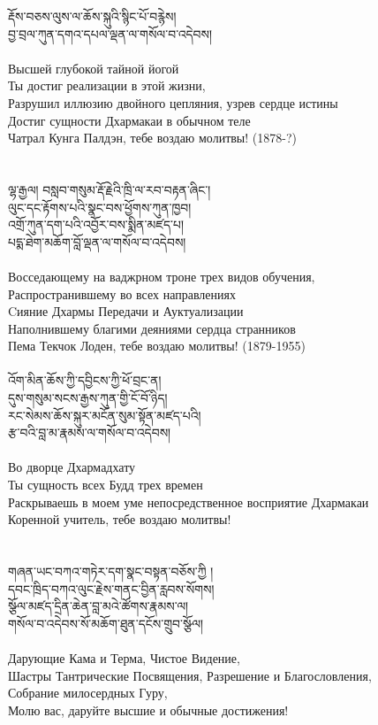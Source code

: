 རྡོས་བཅས་ལུས་ལ་ཆོས་སྐུའི་སྙིང་པོ་བརྙེས། \\
བྱ་བྲལ་ཀུན་དགའ་དཔལ་ལྡན་ལ་གསོལ་བ་འདེབས།\\
\\
\ru
Высшей глубокой тайной йогой \\ Ты достиг реализации в этой жизни,\\
Разрушил иллюзию двойного цепляния, узрев сердце истины \\
Достиг сущности Дхармакаи в обычном теле\\
Чатрал Кунга Палдэн, тебе воздаю молитвы! (1878-?)\\
\\
\\
\ti
ལྷ་རྒྱལ། བསླབ་གསུམ་རྡོ་རྗེའི་ཁྲི་ལ་རབ་བརྟན་ཞིང་། \\
ལུང་དང་རྟོགས་པའི་སྣང་བས་ཕྱོགས་ཀུན་ཁྱབ། \\
འགྲོ་ཀུན་དག་པའི་འབྱོར་བས་སྨིན་མཛད་པ། \\
པདྨ་ཐེག་མཆོག་བློ་ལྡན་ལ་གསོལ་བ་འདེབས།\\
\\
\ru
Восседающему на ваджрном троне трех видов обучения,\\
Распространившему во всех направлениях \\
Cияние Дхармы Передачи и Ауктуализации \\
Наполнившему благими деяниями сердца странников\\
Пема Текчок Лоден, тебе воздаю молитвы! (1879-1955)\\
\\
\newpage
\ti
འོག་མིན་ཆོས་ཀྱི་དབྱིངས་ཀྱི་ཕོ་བྲང་ན། \\
དུས་གསུམ་སངས་རྒྱས་ཀུན་གྱི་ངོ་བོ་ཉིད། \\
རང་སེམས་ཆོས་སྐུར་མངོན་སུམ་སྟོན་མཛད་པའི། \\
རྩ་བའི་བླ་མ་རྣམས་ལ་གསོལ་བ་འདེབས།\\
\\
\ru
Во дворце Дхармадхату\\
Ты сущность всех Будд трех времен\\
Раскрываешь в моем уме непосредственное восприятие Дхармакаи \\
Коренной учитель, тебе воздаю молитвы!\\
\\
\\
\ti
གཞན་ཡང་བཀའ་གཏེར་དག་སྣང་བསྟན་བཅོས་ཀྱི །\\
དབང་ཁྲིད་བཀའ་ལུང་རྗེས་གནང་བྱིན་རླབས་སོགས། \\
སྩོལ་མཛད་དྲིན་ཆེན་བླ་མའེ་ཚོགས་རྣམས་ལ། \\
གསོལ་བ་འདེབས་སོ་མཆོག་ཐུན་དངོས་གྲུབ་སྩོལ།\\
\\
\ru
Дарующие Кама и Терма, Чистое Видение, \\
Шастры Тантрические Посвящения, Разрешение и Благословления, \\
Собрание милосердных Гуру,\\
Молю вас, даруйте высшие и обычные достижения!\\






